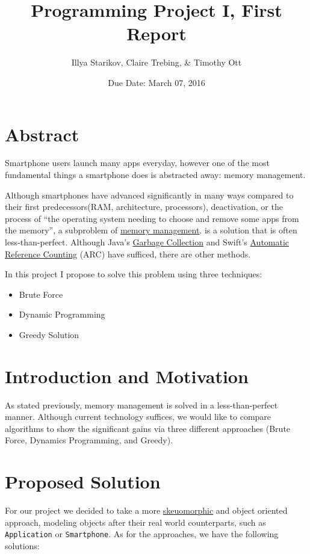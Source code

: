 \documentclass{article}
\title{Programming Project I, First Report}
\author{Illya Starikov, Claire Trebing, \& Timothy Ott}
\date{Due Date: March 07, 2016}
\begin{document}
\maketitle

\section{Abstract}
Smartphone users launch many apps everyday, however one of the most fundamental things a smartphone does is abstracted away: memory management.

Although smartphones have advanced significantly in many ways compared to their first predecessors(RAM, architecture, processors), deactivation, or the process of ``the operating system needing to choose and remove some apps from the memory'', a subproblem of \href{https://en.wikipedia.org/wiki/Memory_management}{memory management}. is a solution that is often less-than-perfect. Although Java's \href{http://www.oracle.com/webfolder/technetwork/tutorials/obe/java/gc01/index.html}{Garbage Collection} and Swift's \href{https://developer.apple.com/library/ios/documentation/Swift/Conceptual/Swift_Programming_Language/AutomaticReferenceCounting.html}{Automatic Reference Counting} (ARC) have sufficed, there are other methods.

In this project I propose to solve this problem using three techniques:

\begin{itemize}
    \item Brute Force
    \item Dynamic Programming
    \item Greedy Solution
\end{itemize}

\section{Introduction and Motivation}
As stated previously, memory management is solved in a less-than-perfect manner. Although current technology suffices, we would like to compare algorithms to show the significant gains via three different approaches (Brute Force, Dynamics Programming, and Greedy).

\section{Proposed Solution}
For our project we decided to take a more \href{https://en.wikipedia.org/wiki/Skeuomorph}{skeuomorphic} and object oriented approach, modeling objects after their real world counterparts, such as \texttt{Application} or \texttt{Smartphone}. As for the approaches, we have the following solutions:
\end{document}
